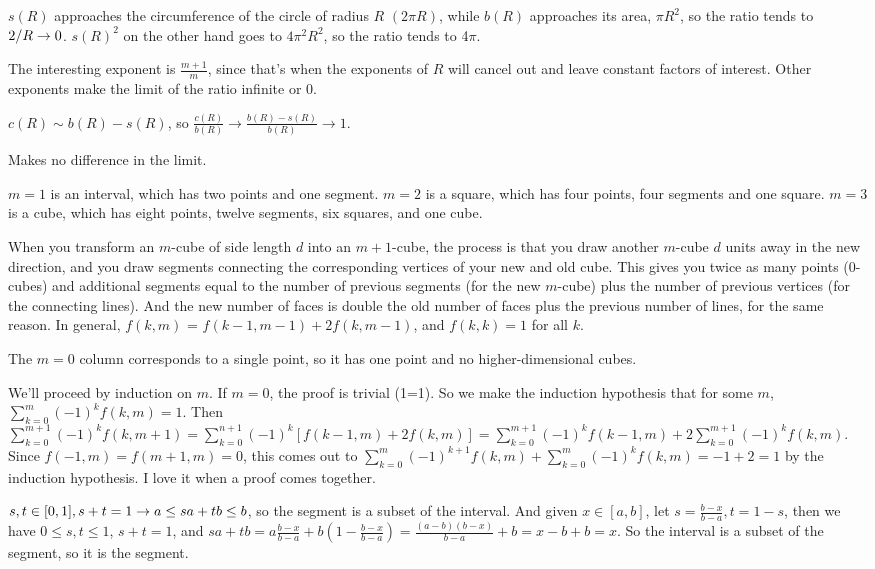 \documentclass[11pt, oneside]{article}   	%
\begin{document}
\ee
\item \be
\item $s(R)$ approaches the circumference of the circle of radius $R$ $(2\pi R)$, while $b(R)$ approaches its area, $\pi R^2$, so the ratio tends to $2/R \rightarrow 0$. $s(R)^2$ on the other hand goes to $4 \pi^2 R^2$, so the ratio tends to 4$\pi$. 
\item The interesting exponent is $\frac{m+1}{m}$, since that's when the exponents of $R$ will cancel out and leave constant factors of interest. Other exponents make the limit of the ratio infinite or 0.
\item $c(R) \sim b(R) - s(R)$, so $\frac{c(R)}{b(R)} \to \frac{b(R) - s(R)}{b(R)} \to 1$. 
\item Makes no difference in the limit.
\ee
\item \be
\item $m=1$ is an interval, which has two points and one segment. $m=2$ is a square, which has four points, four segments and one square. $m=3$ is a cube, which has eight points, twelve segments, six squares, and one cube.
\item When you transform an $m$-cube of side length $d$ into an $m+1$-cube, the process is that you draw another $m$-cube $d$ units away in the new direction, and you draw segments connecting the corresponding vertices of your new and old cube. This gives you twice as many points (0-cubes) and additional segments equal to the number of previous segments (for the new $m$-cube) plus the number of previous vertices (for the connecting lines). And the new number of faces is double the old number of faces plus the previous number of lines, for the same reason. In general, $f(k, m)$ = $f(k-1, m-1) + 2f(k, m-1)$, and $f(k, k) = 1$ for all $k$.
\item The $m=0$ column corresponds to a single point, so it has one point and no higher-dimensional cubes.
\item We'll proceed by induction on $m$. If $m=0$, the proof is trivial (1=1). So we make the induction hypothesis that for some $m$, $\sum_{k=0}^m(-1)^kf(k, m) = 1$. Then $\sum_{k=0}^{m+1}(-1)^kf(k, m+1) = \sum_{k=0}^{n+1}(-1)^k[f(k-1, m) + 2f(k, m)] = \sum_{k=0}^{m+1}(-1)^kf(k-1, m) + 2\sum_{k=0}^{m+1}(-1)^kf(k, m)$. Since $f(-1, m) = f(m+1, m) = 0$, this comes out to $\sum_{k=0}^m(-1)^{k+1}f(k, m) + \sum_{k = 0}^m(-1)^kf(k, m) = -1 + 2 = 1$ by the induction hypothesis. I love it when a proof comes together.
\ee
\item $s, t \in [0, 1], s + t = 1 \rightarrow a \le sa + tb \le b$, so the segment is a subset of the interval. And given $x \in [a, b]$, let $s = \frac{b-x}{b-a}, t = 1-s$, then we have $0 \le s, t \le 1$, $s + t = 1$, and $sa + tb = a\frac{b-x}{b-a} + b(1-\frac{b-x}{b-a}) = \frac{(a-b)(b-x)}{b-a} + b = x - b + b = x$. So the interval is a subset of the segment, so it is the segment.
\end{document}
